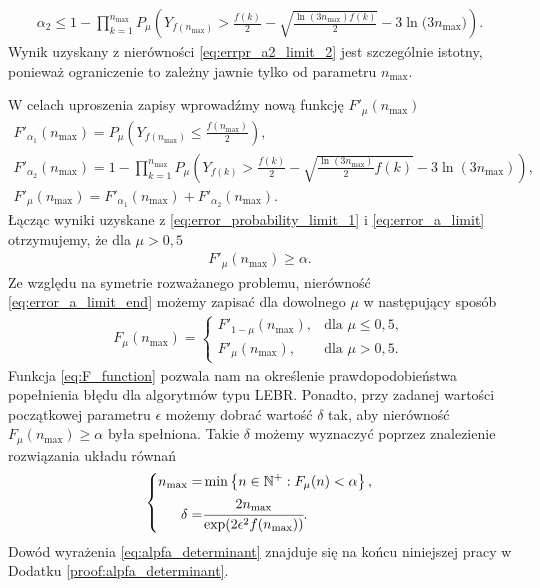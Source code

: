 \documentclass[inzynierska]{pwr_wmat_praca_dyplomowa}
\theoremstyle{plain}
\numberwithin{theorem}{chapter}
\theoremstyle{definition}
\numberwithin{theorem}{chapter}
\newcommand{\nmax}{n_{\text{max}}}
\begin{document}
	\begin{align}
		\label{eq:errpr_a2_limit_2}
		\alpha_2 \le 1 - \prod_{k=1}^{\nmax} P_{\mu}\left( Y_{f(\nmax)}  > \frac{f(k)}{2} -  \sqrt{\frac{\ln(3\nmax)f(k)}{2}} - 3  \ln{(3\nmax})  \right).
	\end{align}
	\noindent
	Wynik uzyskany z nierówności \eqref{eq:errpr_a2_limit_2} jest szczególnie istotny, ponieważ ograniczenie to zależny jawnie tylko od parametru $\nmax$.

	W celach uproszenia zapisy wprowadźmy nową funkcję  $F'_{\mu}(\nmax)$
	\begin{gather}
		F'_{\alpha_1}(\nmax) = P_{\mu}\left( Y_{f(\nmax)}  \le \frac{f(\nmax)}{2} \right), \\
		F'_{\alpha_2}(\nmax) = 1 - \prod_{k=1}^{\nmax} P_{\mu}\left( Y_{f(k)}  > \frac{f(k)}{2} - \sqrt{\frac{\ln(3\nmax)}{2}f(k)} - 3  \ln{(3 \nmax)}\right), \\
		\label{eq:error_a_limit}
		F'_{\mu}(\nmax) =  F'_{\alpha_1}(\nmax)+F'_{\alpha_2}(\nmax).
	\end{gather}
		Łącząc wyniki uzyskane z
		\eqref{eq:error_probability_limit_1} i \eqref{eq:error_a_limit} otrzymujemy, że dla $\mu > 0,5$
	\begin{gather}
		\label{eq:error_a_limit_end}
		F'_{\mu}(\nmax) \ge \alpha .
	\end{gather}
		Ze względu na symetrie rozważanego problemu, nierówność \eqref{eq:error_a_limit_end} możemy zapisać dla dowolnego $\mu$ w następujący sposób
	\begin{align}
		\label{eq:F_function}
		F_{\mu}(\nmax) = 
		\begin{cases}
			F'_{1-\mu}(\nmax), &\text{dla }  \mu\le0,5,\\
			F'_{\mu}(\nmax), &\text{dla } \mu>0,5.
		\end{cases}
	\end{align}
	\noindent
	Funkcja \eqref{eq:F_function} pozwala nam na określenie prawdopodobieństwa popełnienia błędu dla algorytmów typu LEBR. Ponadto, przy zadanej wartości początkowej parametru $\epsilon$ możemy dobrać wartość $\delta$ tak, aby nierówność $F_{\mu}(\nmax) \ge \alpha$ była spełniona. Takie $\delta$ możemy wyznaczyć poprzez znalezienie rozwiązania układu równań
	\begin{gather}
		\label{eq:alpfa_determinant}
		\left\{
		\begin{split}
			\nmax =& \min \left\{n\in \mathbb{N}^+: F_{\mu}(n) < \alpha \right\}, \\
			\delta =&\cfrac{2\nmax}{\exp(2\epsilon^2f(\nmax))}.
		\end{split}
		\right. 
	\end{gather}
	Dowód wyrażenia \eqref{eq:alpfa_determinant} znajduje się na końcu niniejszej pracy w Dodatku \ref{proof:alpfa_determinant}.
	
\end{document}
